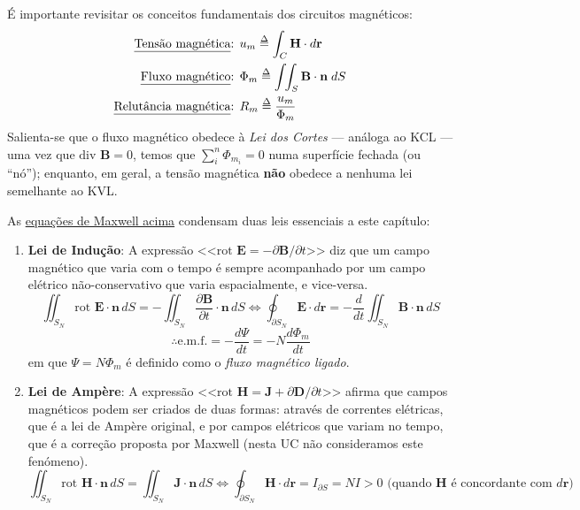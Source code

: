 É importante revisitar os conceitos fundamentais dos circuitos magnéticos: 
$$
    \begin{aligned}
        \text{\underline{Tensão magnética}: }& u_m \delequal \int_C \mathbf{H} \cdot d\mathbf{r} \\
        \text{\underline{Fluxo magnético}: }& \Phi_m \delequal \int\!\!\int_S \mathbf{B} \cdot \mathbf{n}\; dS\\
        \text{\underline{Relutância magnética}: }& R_m \delequal \frac{u_m}{\Phi_m}
    \end{aligned}
$$
Salienta-se que o fluxo magnético obedece à \textit{Lei dos Cortes} --- análoga ao KCL --- uma vez que $\text{div } \mathbf{B} = 0$, temos que $\sum_i^n \Phi_{m_i} = 0$ numa superfície fechada (ou ``nó''); enquanto, em geral, a tensão magnética \textbf{não} obedece a nenhuma lei semelhante ao KVL.

\vspace{0.5em}
\noindent As \hyperref[subsec:maxwell-eq]{equações de Maxwell acima} condensam duas leis essenciais a este capítulo:
\begin{enumerate}
    \item[] \textbf{Lei de Indução}: A expressão <<$\text{rot } \mathbf{E} = -\partial \mathbf{B}/\partial t$>> diz que um campo magnético que varia com o tempo é sempre acompanhado por um campo elétrico não-conservativo que varia espacialmente, e vice-versa.
    $$
        \iint_{S_N} \text{rot } \mathbf{E} \cdot \mathbf{n}\, dS = -\iint_{S_N} \dfrac{\partial \mathbf{B}}{\partial t} \cdot \mathbf{n}\, dS \iff \oint_{\partial S_N} \mathbf{E} \cdot d\mathbf{r} = -\dfrac{d}{dt} \iint_{S_N} \mathbf{B} \cdot \mathbf{n}\, dS 
    $$
    $$
        \boxed{ \therefore \text{e.m.f.} = -\frac{d \Psi}{dt} = -N\frac{d \Phi_m}{dt} }
    $$
    em que $\Psi = N\Phi_m$ é definido como o \textit{fluxo magnético ligado}.

    \item[] \textbf{Lei de Ampère}: A expressão <<$\text{rot } \mathbf{H} = \mathbf{J} + \partial \mathbf{D}/\partial t$>> afirma que campos magnéticos podem ser criados de duas formas: através de correntes elétricas, que é a lei de Ampère original, e por campos elétricos que variam no tempo, que é a correção proposta por Maxwell (nesta UC não consideramos este fenómeno).
    $$
        \iint_{S_N} \text{rot } \mathbf{H} \cdot \mathbf{n}\, dS = \iint_{S_N} \mathbf{J} \cdot \mathbf{n}\, dS \iff \oint_{\partial S_N} \mathbf{H} \cdot d\mathbf{r} = I_{\partial S} = N I > 0 \text{ (quando $\mathbf{H}$ é concordante com $d\mathbf{r}$)}
    $$
\end{enumerate}

